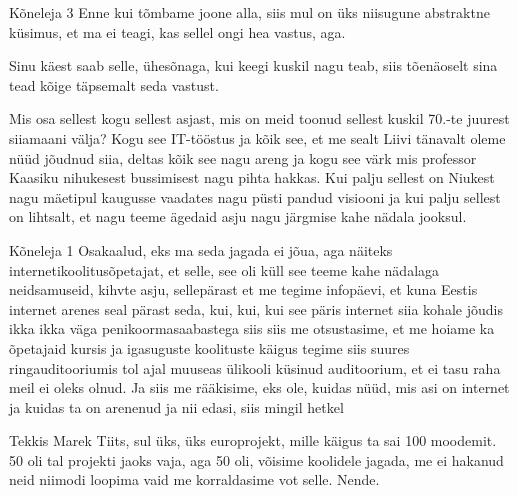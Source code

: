 Kõneleja 3
Enne kui tõmbame joone alla, siis mul on üks niisugune abstraktne küsimus, et ma ei teagi, kas sellel ongi hea vastus, aga. 

Sinu käest saab selle, ühesõnaga, kui keegi kuskil nagu teab, siis tõenäoselt sina tead kõige täpsemalt seda vastust. 

Mis osa sellest kogu sellest asjast, mis on meid toonud sellest kuskil 70.-te juurest siiamaani välja? Kogu see IT-tööstus ja kõik see, et me sealt Liivi tänavalt oleme nüüd jõudnud siia, deltas kõik see nagu areng ja kogu see värk mis professor Kaasiku nihukesest bussimisest nagu pihta hakkas. Kui palju sellest on Niukest nagu mäetipul kaugusse vaadates nagu püsti pandud visiooni ja kui palju sellest on lihtsalt, et nagu teeme ägedaid asju nagu järgmise kahe nädala jooksul. 

Kõneleja 1
Osakaalud, eks ma seda jagada ei jõua, aga näiteks internetikoolitusõpetajat, et selle, see oli küll see teeme kahe nädalaga neidsamuseid, kihvte asju, sellepärast et me tegime infopäevi, et kuna Eestis internet arenes seal pärast seda, kui, kui, kui see päris internet siia kohale jõudis ikka ikka väga penikoormasaabastega siis siis me otsustasime, et me hoiame ka õpetajaid kursis ja igasuguste koolituste käigus tegime siis suures ringauditooriumis tol ajal muuseas ülikooli küsinud auditoorium, et ei tasu raha meil ei oleks olnud. Ja siis me rääkisime, eks ole, kuidas nüüd, mis asi on internet ja kuidas ta on arenenud ja nii edasi, siis mingil hetkel 

Tekkis Marek Tiits, sul üks, üks europrojekt, mille käigus ta sai 100 moodemit. 50 oli tal projekti jaoks vaja, aga 50 oli, võisime koolidele jagada, me ei hakanud neid niimodi loopima vaid me korraldasime vot selle. Nende. 

